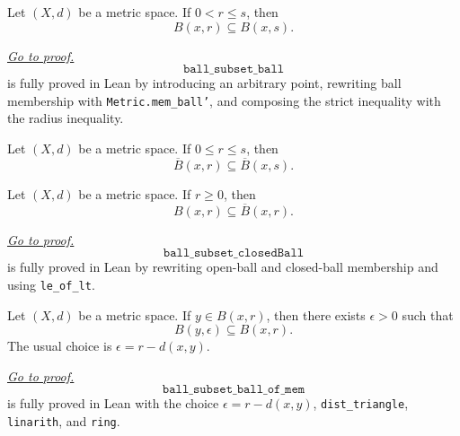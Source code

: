 \begin{remark*}
\label{thm:fv-msml-ball-subset-ball}
\begin{theorem*}
Let $(X,d)$ be a metric space. If $0<r\leq s$, then
\[
  B(x,r)\subseteq B(x,s).
\]
\end{theorem*}
\hyperref[prf:fv-msml-ball-subset-ball]{\textit{Go to proof.}}
\[
  \texttt{ball\_subset\_ball}
\]
is fully proved in Lean by introducing an arbitrary point, rewriting ball
membership with \texttt{Metric.mem\_ball'}, and composing the strict inequality
with the radius inequality.
\end{remark*}

\begin{remark*}
\begin{theorem*}
Let $(X,d)$ be a metric space. If $0\leq r\leq s$, then
\[
  \overline{B}(x,r)\subseteq \overline{B}(x,s).
\]
\end{theorem*}
\end{remark*}

\begin{remark*}
\label{thm:fv-msml-ball-subset-closed-ball}
\begin{theorem*}
Let $(X,d)$ be a metric space. If $r\geq 0$, then
\[
  B(x,r)\subseteq \overline{B}(x,r).
\]
\end{theorem*}
\hyperref[prf:fv-msml-ball-subset-closed-ball]{\textit{Go to proof.}}
\[
  \texttt{ball\_subset\_closedBall}
\]
is fully proved in Lean by rewriting open-ball and closed-ball membership and
using \texttt{le\_of\_lt}.
\end{remark*}

\begin{remark*}
\label{thm:fv-msml-ball-subset-ball-of-mem}
\begin{theorem*}
Let $(X,d)$ be a metric space. If $y\in B(x,r)$, then there exists
$\epsilon>0$ such that
\[
  B(y,\epsilon)\subseteq B(x,r).
\]
The usual choice is \(\epsilon=r-d(x,y)\).
\end{theorem*}
\hyperref[prf:fv-msml-ball-subset-ball-of-mem]{\textit{Go to proof.}}
\[
  \texttt{ball\_subset\_ball\_of\_mem}
\]
is fully proved in Lean with the choice \(\epsilon=r-d(x,y)\),
\texttt{dist\_triangle}, \texttt{linarith}, and \texttt{ring}.
\end{remark*}

